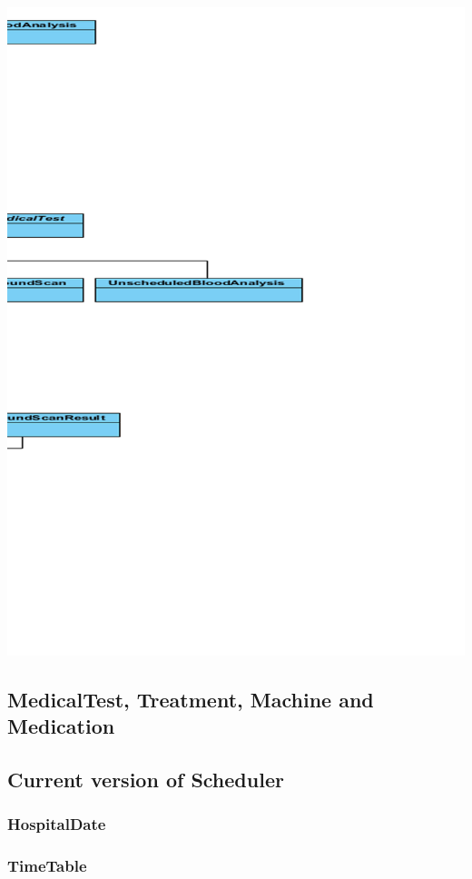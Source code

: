 \documentclass[11pt]{article}
\begin{document}
\includegraphics[width=170mm]{right.png}\\


\subsection{MedicalTest, Treatment, Machine and Medication}

\subsection{Current version of Scheduler}
\subsubsection{HospitalDate}
\subsubsection{TimeTable}
\end{document}
